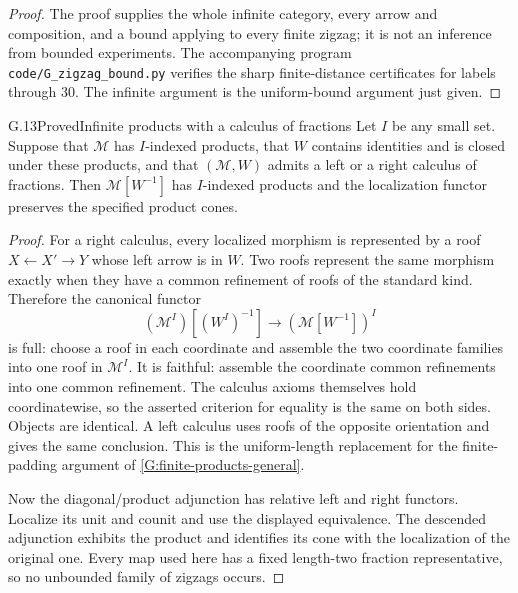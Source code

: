 \begin{proof}
The proof supplies the whole infinite category, every arrow and
composition, and a bound applying to every finite zigzag; it is
not an inference from bounded experiments.  The accompanying
program \texttt{code/G\_zigzag\_bound.py} verifies the sharp
finite-distance certificates for labels through $30$.  The
infinite argument is the uniform-bound argument just given.
\end{proof}

\begin{claim}{G.13}{Proved}{Infinite products with a calculus of fractions}
\label{G:fractions-products}
Let $I$ be any small set.  Suppose that $\mathcal M$ has
$I$-indexed products, that $W$ contains identities and is closed
under these products, and that $(\mathcal M,W)$ admits a left
or a right calculus of fractions.  Then $\mathcal M[W^{-1}]$
has $I$-indexed products and the localization functor preserves
the specified product cones.
\end{claim}
\begin{proof}
For a right calculus, every localized morphism is represented
by a roof $X\leftarrow X'\to Y$ whose left arrow is in $W$.
Two roofs represent the same morphism exactly when they have
a common refinement of roofs of the standard kind.  Therefore
the canonical functor
\[
 (\mathcal M^I)[(W^I)^{-1}]
       \longrightarrow (\mathcal M[W^{-1}])^I
\]
is full: choose a roof in each coordinate and assemble the
two coordinate families into one roof in $\mathcal M^I$.
It is faithful: assemble the coordinate common refinements into
one common refinement.  The calculus axioms themselves hold
coordinatewise, so the asserted criterion for equality is the
same on both sides.  Objects are identical.  A left calculus
uses roofs of the opposite orientation and gives the same
conclusion.  This is the uniform-length replacement for the
finite-padding argument of \ref{G:finite-products-general}.

Now the diagonal/product adjunction has relative left and right
functors.  Localize its unit and counit and use the displayed
equivalence.  The descended adjunction exhibits the product
and identifies its cone with the localization of the original
one.  Every map used here has a fixed length-two fraction
representative, so no unbounded family of zigzags occurs.
\end{proof}

